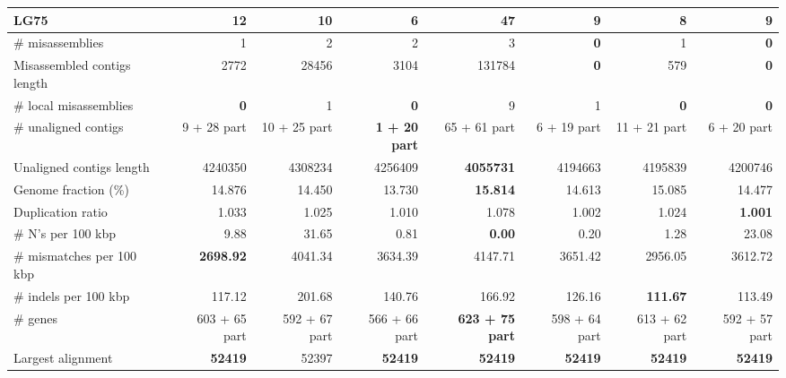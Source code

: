 \documentclass[12pt,a4paper]{article}
\begin{document}
\begin{table}[ht]
\begin{center}
\begin{tabular}{|l*{7}{|r}|}
LG75 & 12 & 10 & {\bf 6} & 47 & 9 & 8 & 9 \\ \hline
\# misassemblies & 1 & 2 & 2 & 3 & {\bf 0} & 1 & {\bf 0} \\ \hline
Misassembled contigs length & 2772 & 28456 & 3104 & 131784 & {\bf 0} & 579 & {\bf 0} \\ \hline
\# local misassemblies & {\bf 0} & 1 & {\bf 0} & 9 & 1 & {\bf 0} & {\bf 0} \\ \hline
\# unaligned contigs & 9 + 28 part & 10 + 25 part & {\bf 1 + 20 part} & 65 + 61 part & 6 + 19 part & 11 + 21 part & 6 + 20 part \\ \hline
Unaligned contigs length & 4240350 & 4308234 & 4256409 & {\bf 4055731} & 4194663 & 4195839 & 4200746 \\ \hline
Genome fraction (\%) & 14.876 & 14.450 & 13.730 & {\bf 15.814} & 14.613 & 15.085 & 14.477 \\ \hline
Duplication ratio & 1.033 & 1.025 & 1.010 & 1.078 & 1.002 & 1.024 & {\bf 1.001} \\ \hline
\# N's per 100 kbp & 9.88 & 31.65 & 0.81 & {\bf 0.00} & 0.20 & 1.28 & 23.08 \\ \hline
\# mismatches per 100 kbp & {\bf 2698.92} & 4041.34 & 3634.39 & 4147.71 & 3651.42 & 2956.05 & 3612.72 \\ \hline
\# indels per 100 kbp & 117.12 & 201.68 & 140.76 & 166.92 & 126.16 & {\bf 111.67} & 113.49 \\ \hline
\# genes & 603 + 65 part & 592 + 67 part & 566 + 66 part & {\bf 623 + 75 part} & 598 + 64 part & 613 + 62 part & 592 + 57 part \\ \hline
Largest alignment & {\bf 52419} & 52397 & {\bf 52419} & {\bf 52419} & {\bf 52419} & {\bf 52419} & {\bf 52419} \\ \hline
\end{tabular}
\end{center}
\end{table}
\end{document}
